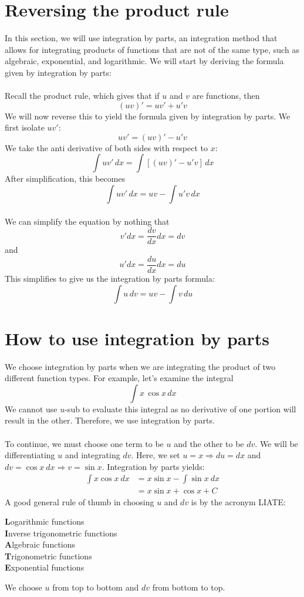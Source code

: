 \documentclass[11pt]{scrartcl}
\begin{document}
\maketitle
\noindent 

\section{Reversing the product rule}
\noindent
In this section, we will use integration by parts, an integration method that allows for integrating products of functions that are not of the same type, such as algebraic, exponential, and logarithmic. We will start by deriving the formula given by integration by parts: \\
\\
\noindent 
Recall the product rule, which gives that if $u$ and $v$ are functions, then
$$(uv)'=uv'+u'v$$
We will now reverse this to yield the formula given by integration by parts. We first isolate $uv'$:
$$uv'=(uv)'-u'v$$
We take the anti derivative of both sides with respect to $x$:
$$\int uv'\, dx={\int[(uv)'-u'v] \, dx}$$
After simplification, this becomes 
$$\int uv' \, dx={uv-\int u'v \, dx}$$
\\
\noindent 
We can simplify the equation by nothing that $$v'dx=\frac{dv}{dx}dx=dv$$ and $$u'dx=\frac{du}{dx}dx=du$$
This simplifies to give us the integration by parts formula:
$$\int u \, dv=uv-\int v \, du$$ 
\section{How to use integration by parts}
\noindent
We choose integration by parts when we are integrating the product of two different function types. For example, let's examine the integral $$\int x \, \cos x \, dx$$
We cannot use $u$-sub to evaluate this integral as no derivative of one portion will result in the other. Therefore, we use integration by parts.\\
\\
\noindent To continue, we must choose one term to be $u$ and the other to be $dv$. We will be differentiating $u$ and integrating $dv$. Here, we set $u=x \Rightarrow du=dx$ and $dv=\cos x \ dx \Rightarrow v= \sin x$. Integration by parts yields: 
\begin{align*}
    \int{x\cos x \ dx} &=x \sin x - \int{\sin x \ dx} \\
                       &= x \sin x + \cos x + C
\end{align*}
A good general rule of thumb in choosing $u$ and $dv$ is by the acronym LIATE: 
\begin{center}
    \textbf{L}ogarithmic functions \\
    \textbf{I}nverse trigonometric functions \\
    \textbf{A}lgebraic functions \\
    \textbf{T}rigonometric functions \\
    \textbf{E}xponential functions
\end{center}
We choose $u$ from top to bottom and $dv$ from bottom to top.
\end{document}
